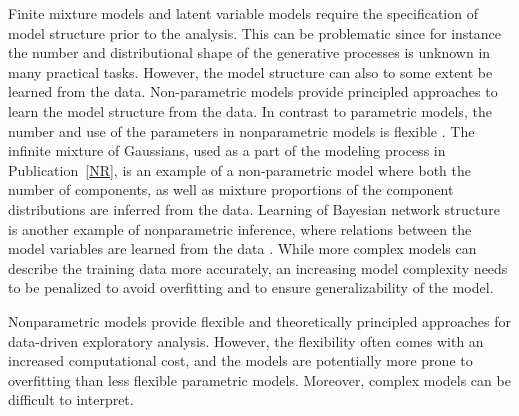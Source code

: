 Finite mixture models and latent variable models require the
specification of model structure prior to the analysis. This can be
problematic since for instance the number and distributional shape of
the generative processes is unknown in many practical tasks. However,
the model structure can also to some extent be learned from the data.
Non-parametric models provide principled approaches to learn the model
structure from the data.  In contrast to parametric models, the number
and use of the parameters in nonparametric models is flexible
\citep[see e.g.][]{Hjort10, Muller2004}. The infinite mixture of
Gaussians, used as a part of the modeling process in
Publication~\ref{NR}, is an example of a non-parametric model where
both the number of components, as well as mixture proportions of the
component distributions are inferred from the data. Learning of
Bayesian network structure is another example of nonparametric
inference, where relations between the model variables are learned
from the data \citep[see e.g.][]{Friedman03}. While more complex
models can describe the training data more accurately, an increasing
model complexity needs to be penalized to avoid overfitting and to
ensure generalizability of the model.

Nonparametric models provide flexible and theoretically principled
approaches for data-driven exploratory analysis. However, the
flexibility often comes with an increased computational cost, and the
models are potentially more prone to overfitting than less flexible
parametric models. Moreover, complex models can be difficult to
interpret.

